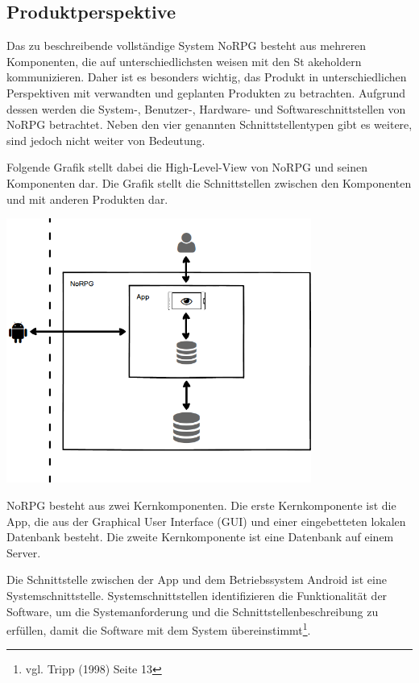 	\subsection{Produktperspektive}
		Das zu beschreibende vollständige System NoRPG besteht aus mehreren Komponenten, die auf unterschiedlichsten weisen mit den St akeholdern kommunizieren. Daher ist es besonders wichtig, das Produkt in unterschiedlichen Perspektiven mit verwandten und geplanten Produkten zu betrachten. Aufgrund dessen werden die System-, Benutzer-, Hardware- und Softwareschnittstellen von NoRPG betrachtet. Neben den vier genannten Schnittstellentypen gibt es weitere, sind jedoch nicht weiter von Bedeutung.
		
		Folgende Grafik stellt dabei die High-Level-View von NoRPG und seinen Komponenten dar. Die Grafik stellt die Schnittstellen zwischen den Komponenten und mit anderen Produkten dar.
		
		\begin{center}
			\includegraphics[width=10cm]{pics/HighLevelView.png}
		\end{center}
		
		NoRPG besteht aus zwei Kernkomponenten. Die erste Kernkomponente ist die App, die aus der Graphical User Interface (GUI) und einer eingebetteten lokalen Datenbank besteht. Die zweite Kernkomponente ist eine Datenbank auf einem Server.
		
		Die Schnittstelle zwischen der App und dem Betriebssystem Android ist eine Systemschnittstelle. Systemschnittstellen identifizieren die Funktionalität der Software, um die Systemanforderung und die Schnittstellenbeschreibung zu erfüllen, damit die Software mit dem System übereinstimmt\footnote{vgl. Tripp \cite{srsIEEE}(1998) Seite 13}.
		
